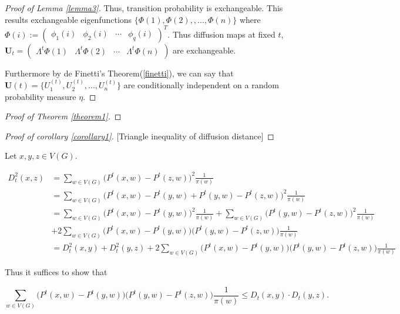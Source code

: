 \documentclass[12pt]{article}
\theoremstyle{definition}
\begin{document}
\begin{proof}[Proof of Lemma \ref{lemma3}]
		
		Thus, transition probability is exchangeable. 
		This results exchangeable eigenfunctions $\{ \Phi(1), \Phi(2), , ... , \Phi(n) \}$ 
		where $\Phi(i) := \begin{pmatrix} \phi_{1}(i) & \phi_{2}(i) & \cdots & \phi_{q}(i) \end{pmatrix}^{T}$. Thus diffusion maps at fixed $t$, $\mathbf{U}_{t} = \begin{pmatrix} \Lambda^{t} \Phi(1)  & \Lambda^{t} \Phi(2) & \cdots & \Lambda^{t} \Phi(n)  \end{pmatrix}$ are exchangeable. 
		
		Furthermore by de Finetti's Theorem(\ref{finetti}), we can say that $\mathbf{U}(t) = \{ U^{(t)}_{1}, U^{(t)}_{2}, ... , U^{(t)}_{n} \}$ are conditionally independent on a random probability measure $\eta$. 
	\end{proof}
	
	
	\begin{proof}[Proof of Theorem \ref{theorem1}]
	\end{proof}
	
	
	\begin{proof}[Proof of corollary \ref{corollary1}][Triangle inequality of diffusion distance]
	\end{proof}
	
	Let $x, y, z \in V(G).$
	
	\begin{equation}
	\begin{split}
	D^{2}_{t}(x,z) & = \sum\limits_{w \in V(G)} \big( P^{t}(x,w) - P^{t}(z,w)   \big)^2 \frac{1}{\pi(w)}  \\ & = \sum\limits_{w \in V(G)} \big(P^{t}(x, w) - P^{t}(y,w) + P^{t}(y,w) - P^{t}(z,w) \big)^2 \frac{1}{\pi(w)} \\ & = \sum\limits_{w \in V(G)} \big( P^{t}(x,w) - P^{t}(y,w) \big)^2 \frac{1}{\pi(w)}  + \sum\limits_{w \in V(G)} \big( P^{t}(y,w) - P^{t}(z,w)  \big)^2 \frac{1}{\pi(w)} \\ & + 2 \sum\limits_{w \in V(G)} \big( P^{t}(x,w) - P^{t}(y,w)  \big) \big( P^{t}(y,w) - P^{t}(z,w)  \big)\frac{1}{\pi(w)} \\ &= D^{2}_{t}(x,y) + D^{2}_{t}(y,z) +  2 \sum\limits_{w \in V(G)} \big( P^{t}(x,w) - P^{t}(y,w)  \big) \big( P^{t}(y,w) - P^{t}(z,w)  \big)\frac{1}{\pi(w)}   
	\end{split}
	\end{equation}
	
	
	Thus it suffices to show that 
	
	\begin{equation}
	\sum\limits_{w \in V(G)} \big( P^{t}(x,w) - P^{t}(y,w)  \big) \big( P^{t}(y,w) - P^{t}(z,w)  \big)\frac{1}{\pi(w)} \leq D_{t}(x,y) \cdot D_{t}(y,z). 
	\end{equation}
	
\end{document}
